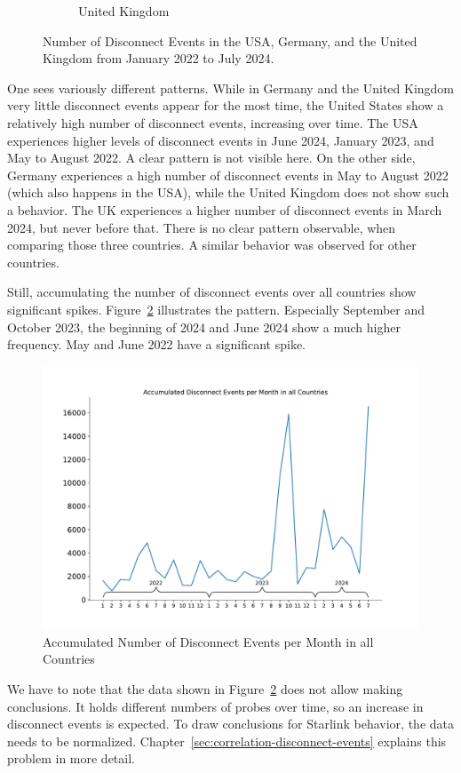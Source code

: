 \begin{figure}
\begin{subfigure}[b]{0.48\linewidth}
		\caption{United Kingdom}
	\end{subfigure}
	\caption{Number of Disconnect Events in the USA, Germany, and the
		United Kingdom from January 2022 to July 2024.}
	\label{fig:disconnect-events-absolute}
\end{figure}

One sees variously different patterns. While in Germany and the United Kingdom
very little disconnect events appear for the most time, the United States show
a relatively high number of disconnect events, increasing over time. The USA
experiences higher levels of disconnect events in June 2024, January 2023, and
May to August 2022. A clear pattern is not visible here. On the other side,
Germany experiences a high number of disconnect events in May to August 2022
(which also happens in the USA), while the United Kingdom does not show such a
behavior. The UK experiences a higher number of disconnect events in March
2024, but never before that. There is no clear pattern observable, when
comparing those three countries. A similar behavior was observed for other
countries.

Still, accumulating the number of disconnect events over all countries show
significant spikes. Figure~\ref{fig:disconnect-events-absolute-all-countries}
illustrates the pattern. Especially September and October 2023, the beginning
of 2024 and June 2024 show a much higher frequency. May and June 2022 have a
significant spike.

\begin{figure}
	\centering
	\includegraphics[width=.7\linewidth]{./chapters/4-results/disconnect_events/accumulated_disconnect_events_per_month_in_all_countries.pdf}
	\caption{Accumulated Number of Disconnect Events per Month in all
		Countries}
	\label{fig:disconnect-events-absolute-all-countries}
\end{figure}

We have to note that the data shown in
Figure~\ref{fig:disconnect-events-absolute-all-countries} does not allow making
conclusions. It holds different numbers of probes over time, so an increase in
disconnect events is expected. To draw conclusions for Starlink behavior, the
data needs to be normalized. Chapter~\ref{sec:correlation-disconnect-events}
explains this problem in more detail.

